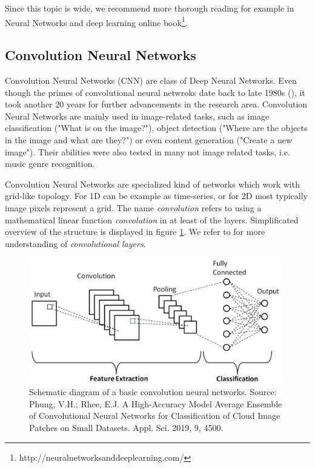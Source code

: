 Since this topic is wide, we recommend more thorough reading for example in Neural Networks and deep learning online book\footnote{http://neuralnetworksanddeeplearning.com/}.

\subsection{Convolution Neural Networks}

Convolution Neural Networks (CNN) are class of Deep Neural Networks. Even though the primes of convolutional neural netwroks date back to late 1980s (\cite{lecun1989backpropagation}), it took another 20 years for further advancements in the research area. Convolution Neural Networks are mainly used in image-related tasks, such as image classification ("What is on the image?"), object detection ("Where are the objects in the image and what are they?") or even content generation ("Create a new image"). Their abilities were also tested in many not image related tasks, i.e. music genre recognition.

Convolution Neural Networks are specialized kind of networks which work with grid-like topology. For 1D can be example as time-series, or for 2D most typically image pixels represent a grid. The name \emph{convolution} refers to using a mathematical linear function \emph{convolution} in at least of the layers. Simplificated overview of the structure is displayed in figure \ref{fig:convolution_neural_network}. We refer to \cite{Goodfellow-et-al-2016} for more understanding of \emph{convolutional layers}.

\begin{figure}
    \centering
    \includegraphics[width=0.98\textwidth]{img/convolution_neural_network.jpg}
    \caption{Schematic diagram of a basic convolution neural networks. Source: Phung, V.H.; Rhee, E.J. A High-Accuracy Model Average Ensemble of Convolutional Neural Networks for Classification of Cloud Image Patches on Small Datasets. Appl. Sci. 2019, 9, 4500.}
    \label{fig:convolution_neural_network}
\end{figure}

